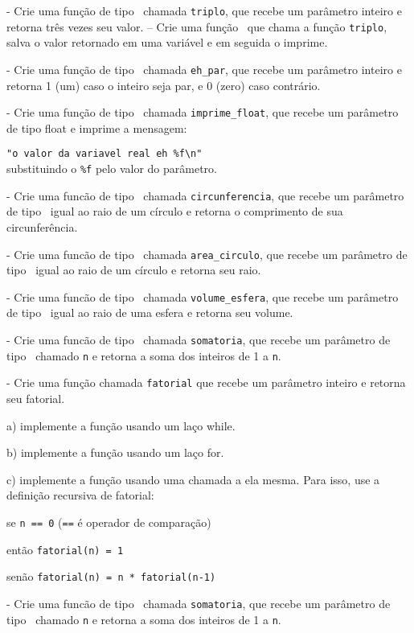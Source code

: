 \NEWLINE
\quest - Crie uma função de tipo \INT\ chamada {\tt triplo}, que recebe um parâmetro inteiro e retorna três vezes seu valor.
\NEWLINE
\quest – Crie uma função \MAIN\ que chama a função {\tt triplo}, salva o valor retornado em uma variável e em seguida o imprime.

\NEWLINE
\quest - Crie uma função de tipo \INT\ chamada \verb|eh_par|, que recebe um parâmetro inteiro e retorna 1 (um) caso o inteiro seja par, e 0 (zero) caso contrário.

\NEWLINE
\quest - Crie uma função de tipo \VOID\ chamada \verb|imprime_float|, que recebe um parâmetro de tipo float e imprime a mensagem:

\verb|"o valor da variavel real eh %f\n"|
\\
substituindo o \verb|%f| pelo valor do parâmetro.



\NEWLINE
\quest - Crie uma funcão de tipo \FLOAT\ chamada \verb|circunferencia|, que recebe um parâmetro de tipo \FLOAT\ igual ao raio de um círculo e retorna o comprimento de sua circunferência.

\NEWLINE
\quest - Crie uma funcão de tipo \FLOAT\ chamada \verb|area_circulo|, que recebe um parâmetro de tipo \FLOAT\ igual ao raio de um círculo e retorna seu raio.

\NEWLINE
\quest - Crie uma funcão de tipo \FLOAT\ chamada \verb|volume_esfera|, que recebe um parâmetro de tipo \FLOAT\ igual ao raio de uma esfera e retorna seu volume.

\NEWLINE
\quest - Crie uma funcão de tipo \INT\ chamada \verb|somatoria|, que recebe um parâmetro de tipo \INT\ chamado {\tt n} e retorna a soma dos inteiros de 1 a {\tt n}.

\NEWLINE
\quest - Crie uma função chamada {\tt fatorial} que recebe um parâmetro inteiro e retorna seu fatorial.

	a) implemente a função usando um laço while.

	b) implemente a função usando um laço for.

	c) implemente a função usando uma chamada a ela mesma. Para isso, use a definição recursiva de fatorial:

		se {\tt n == 0} ({\tt ==} é operador de comparação) 

então {\tt fatorial(n) = 1}

		senão {\tt fatorial(n) = n * fatorial(n-1)}

\NEWLINE
\quest - Crie uma funcão de tipo \INT\ chamada {\tt somatoria}, que recebe um parâmetro de tipo \INT\ chamado {\tt n} e retorna a soma dos inteiros de 1 a {\tt n}.


